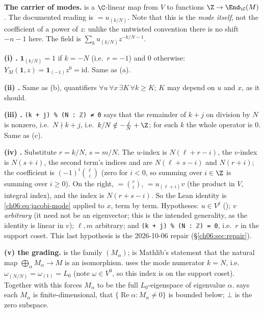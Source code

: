 \begin{dictionary}
\textbf{The carrier of modes.}   is a $\C$-linear map from
$V$ to functions $\Z\to\End_\C(M)$.  The documented reading is  $=u_{(k/N)}$.  Note
that this is the \emph{mode itself}, not the coefficient of a power of $z$: unlike the untwisted
 convention there is no shift $-n-1$ here.  The field is $\sum_k u_{(k/N)}z^{-k/N-1}$.

\textbf{(i) .}  $\mathbf 1_{(k/N)}=1$ if $k=-N$ (i.e.\ $r=-1$) and $0$ otherwise:
$Y_M(\mathbf 1,z)=\mathbf 1_{(-1)}z^0=\mathrm{id}$.  Same as (a).

\textbf{(ii) .}  Same as (b), quantifiers $\forall u\,\forall x\,\exists K\,
\forall k\ge K$; $K$ may depend on $u$ and $x$, as it should.

\textbf{(iii) .}  \texttt{(k + j) \% (N : ℤ) ≠ 0} says that the remainder of $k+j$ on
division by $N$ is nonzero, i.e.\ $N\nmid k+j$, i.e.\ $k/N\notin-\tfrac jN+\Z$; for such $k$ the
whole operator  is $0$.  Same as (c).

\textbf{(iv) .}  Substitute $r=k/N$, $s=m/N$.  The $u$-index
 is $N(\ell+r-i)$, the $v$-index  is $N(s+i)$, the second
term's indices  and  are $N(\ell+s-i)$ and $N(r+i)$; the
coefficient  is $(-1)^i\binom\ell i$ (zero for $i<0$, so summing over
$i\in\Z$ is summing over $i\ge0$).  On the right,  $=\binom ri$,
 $=u_{(\ell+i)}v$ (the product in $V$, integral index), and the index
 is $N(r+s-i)$.  So the Lean identity is \eqref{ch06:eq:jacobi-mode} applied to
$x$, term by term.  Hypotheses: $u\in V^j$ (); $v$
\emph{arbitrary} (it need not be an eigenvector; this is the intended generality, as the
identity is linear in $v$); $\ell,m$ arbitrary; and \texttt{(k + j) \% (N : ℤ) = 0}, i.e.\ $r$ in the
support coset.  This last hypothesis is the 2026-10-06 repair (\S\ref{ch06:sec:repair}).

\textbf{(v) the grading.}   is the family $(M_\alpha)$;
 is Mathlib's statement that the natural map
$\bigoplus_\alpha M_\alpha\to M$ is an isomorphism.   uses the mode numerator
$k=N$, i.e.\ $\omega_{(N/N)}=\omega_{(1)}=L_0$ (note $\omega\in V^0$, so this index is on the
support coset).  Together with  this forces $M_\alpha$ to be the full
$L_0$-eigenspace of eigenvalue $\alpha$.   says each $M_\alpha$ is
finite-dimensional,  that $\{\operatorname{Re}\alpha : M_\alpha\neq 0\}$ is
bounded below; $\bot$ is the zero subspace.


\end{dictionary}
